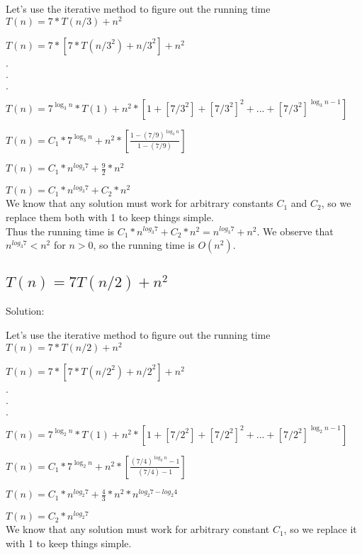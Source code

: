 \documentclass[18 pt]{article}
\begin{document}
Let's use the iterative method to figure out the running time \\

$T(n) = 7*T(n/3) + n^2$

$T(n) = 7*[7*T(n/{3^2})+{n/3}^2] + n^2 $

$.$

$.$

$.$

$T(n) = 7^{\log_3{n}}*T(1) + n^2*[1+[7/{3^2}]+[7/{3^2}]^2+...+[7/{3^2}]^{\log_3{n}-1} ]$

$T(n)= C_1 * 7^{\log_3{n}} + n^2 * \left[ \frac{1-(7/9)^{\log_3{n}}}{1-(7/9)} \right]$

$T(n) = C_1*n^{log_3{7}} + \frac{9}{2}*n^2$

$T(n)= C_1*n^{log_3{7}} + C_2*n^2$\\

We know that any solution must work for arbitrary constants $C_1$ and $C_2$, so we replace them both with 1 to keep things simple. \\

Thus the running time is $C_1*n^{log_3{7}} + C_2*n^2 = n^{log_3{7}} + n^2$. We observe that $ n^{log_3{7}} < n^2$ for $n>0$, so the running time is $O(n^2)$.


\begin{flushleft}
\section{$T(n) = 7T(n/2) + n^2$}
\Large Solution:
\end{flushleft}

Let's use the iterative method to figure out the running time \\

$T(n) = 7*T(n/2) + n^2$

$T(n) = 7*[7*T(n/{2^2})+{n/2}^2] + n^2 $

$.$

$.$

$.$

$T(n) = 7^{\log_2{n}}*T(1) + n^2*[1+[7/{2^2}]+[7/{2^2}]^2+...+[7/{2^2}]^{\log_2{n}-1} ]$

$T(n)= C_1 * 7^{\log_2{n}} + n^2 * \left[ \frac{(7/4)^{\log_2{n}}-1}{(7/4)-1} \right]$

$T(n) = C_1*n^{log_2{7}} + \frac{4}{3}*n^2*n^{log_2{7}-log_2{4}}$

$T(n)= C_2*n^{log_2{7}} $\\

We know that any solution must work for arbitrary constant $C_1$, so we replace it with 1 to keep things simple. \\
\end{document}
